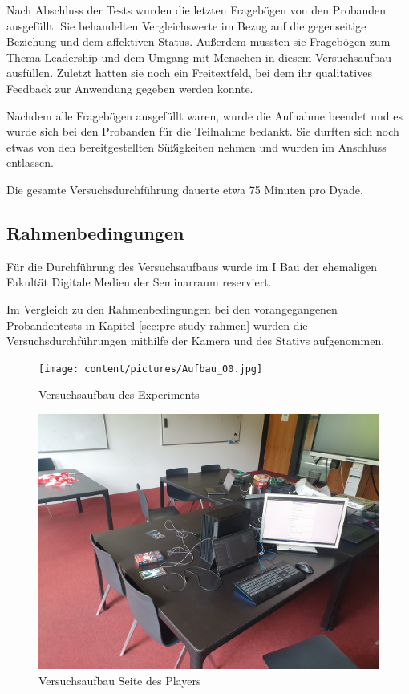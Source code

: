 Nach Abschluss der Tests wurden die letzten Fragebögen von den Probanden ausgefüllt. Sie behandelten Vergleichswerte im Bezug auf die gegenseitige Beziehung und dem affektiven Status. Außerdem mussten sie Fragebögen zum Thema Leadership und dem Umgang mit Menschen in diesem Versuchsaufbau ausfüllen. Zuletzt hatten sie noch ein Freitextfeld, bei dem ihr qualitatives Feedback zur Anwendung gegeben werden konnte.

Nachdem alle Fragebögen ausgefüllt waren, wurde die Aufnahme beendet und es wurde sich bei den Probanden für die Teilnahme bedankt. Sie durften sich noch etwas von den bereitgestellten Süßigkeiten nehmen und wurden im Anschluss entlassen.

Die gesamte Versuchsdurchführung dauerte etwa 75 Minuten pro Dyade.

\subsection{Rahmenbedingungen}
Für die Durchführung des Versuchsaufbaus wurde im I Bau der ehemaligen Fakultät Digitale Medien der Seminarraum reserviert. 

Im Vergleich zu den Rahmenbedingungen bei den vorangegangenen Probandentests in Kapitel \ref{sec:pre-study-rahmen} wurden die Versuchsdurchführungen mithilfe der Kamera und des Stativs aufgenommen.

\begin{figure}[ht]
\centering
\texttt{[image: content/pictures/Aufbau\_00.jpg]}
\caption{Versuchsaufbau des Experiments}
\label{fig:study-experiment-00}
\end{figure}

\begin{figure}[ht]
\centering
\includegraphics[width=1\linewidth]{content/pictures/Aufbau_01.jpg}
\caption{Versuchsaufbau Seite des Players}
\label{fig:study-experiment-01}
\end{figure}

